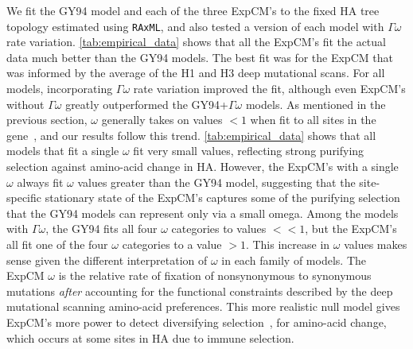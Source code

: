 \documentclass[11pt]{article}
\begin{document}
We fit the GY94 model and each of the three ExpCM's to the fixed HA tree topology estimated using \texttt{RAxML}, and also tested a version of each model with $\Gamma\omega$ rate variation.
\ref{tab:empirical_data} shows that all the ExpCM's fit the actual data much better than the GY94 models.
The best fit was for the ExpCM that was informed by the average of the H1 and H3 deep mutational scans.
For all models, incorporating $\Gamma\omega$ rate variation improved the fit, although even ExpCM's without $\Gamma\omega$ greatly outperformed the GY94+$\Gamma\omega$ models.
As mentioned in the previous section, $\omega$ generally takes on values $<1$ when fit to all sites in the gene~\citep{murrell2015gene}, and our results follow this trend. 
\ref{tab:empirical_data} shows that all models that fit a single $\omega$ fit very small values, reflecting strong purifying selection against amino-acid change in HA. 
However, the ExpCM's with a single $\omega$ always fit $\omega$ values greater than the GY94 model, suggesting that the site-specific stationary state of the ExpCM's captures some of the purifying selection that the GY94 models can represent only via a small omega.
Among the models with $\Gamma\omega$, the GY94 fits all four $\omega$ categories to values $<< 1$, but the ExpCM's all fit one of the four $\omega$ categories to a value $>1$.
This increase in $\omega$ values makes sense given the different interpretation of $\omega$ in each family of models. 
The ExpCM $\omega$ is the relative rate of fixation of nonsynonymous to synonymous mutations \textit{after} accounting for the functional constraints described by the deep mutational scanning amino-acid preferences.
This more realistic null model gives ExpCM's more power to detect diversifying selection~\citep{bloom2017identification, rodrigue2016detecting}, for amino-acid change, which occurs at some sites in HA due to immune selection.
\end{document}
